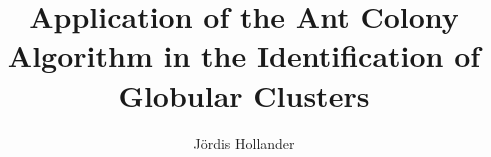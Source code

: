 \documentclass{report}
\author{Jördis Hollander}
\title{Application of the Ant Colony Algorithm in the Identification of Globular Clusters}
\begin{document}
\maketitle{}




\tableofcontents{}









\printbibliography{}
\end{document}
